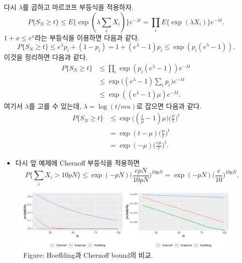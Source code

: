 \documentclass[
  letterpaper,
  DIV=11,
  numbers=noendperiod]{scrreprt}
\providecommand{\tightlist}{%
  \setlength{\itemsep}{0pt}\setlength{\parskip}{0pt}}
\theoremstyle{definition}
\theoremstyle{plain}
\theoremstyle{plain}
\theoremstyle{definition}
\theoremstyle{plain}
\theoremstyle{definition}
\theoremstyle{remark}
\begin{document}
\begin{tcolorbox}[enhanced jigsaw, left=2mm, arc=.35mm, leftrule=.75mm, colback=white, title=\textcolor{quarto-callout-note-color}{\faInfo}\hspace{0.5em}{Proof}, rightrule=.15mm, breakable, bottomrule=.15mm, coltitle=black, opacitybacktitle=0.6, opacityback=0, toptitle=1mm, titlerule=0mm, toprule=.15mm, colbacktitle=quarto-callout-note-color!10!white, bottomtitle=1mm, colframe=quarto-callout-note-color-frame]

다시 \(\lambda\)를 곱하고 마르코프 부등식을 적용하자. \[
P\{ S_N \geq t \} \leq E\{ \exp (\lambda \sum_{i} X_i) \}e^{-\lambda t} = \prod_i E\{ \exp (\lambda X_i) \}e^{-\lambda t}.
\] \(1+x \leq e^{x}\)라는 부등식을 이용하면 다음과 같다. \[
P\{ S_N \geq t \} \leq  e^{\lambda}p_i + (1-p_i) = 1 + (e^{\lambda} - 1)p_i \leq \exp (p_i (e^\lambda - 1)).
\] 이것을 정리하면 다음과 같다. \[
\begin{align*}
P\{ S_N \geq t \} &\leq \prod_i \exp (p_i (e^\lambda -1))e^{-\lambda t}\\
&\leq \exp \Big( (e^\lambda - 1)\sum_i p_i \Big) e^{-\lambda t}\\
&\leq \exp ((e^{\lambda}-1)\mu) e^{-\lambda t}.
\end{align*}
\] 여기서 \(\lambda\)를 고를 수 있는데, \(\lambda = \log (t/mu)\)로
잡으면 다음과 같다. \[
\begin{align*}
P\{ S_N \geq t \} &\leq \exp \Big( (\frac{t}{\mu}-1)\mu \Big) \Big( \frac{\mu}{t} \Big)^t\\
&= \exp (t-\mu) \Big( \frac{\mu}{t} \Big)^t\\
&=\exp (-\mu) \Big( \frac{e\mu}{t} \Big)^t.
\end{align*}
\]

\end{tcolorbox}

\begin{itemize}
\tightlist
\item
  다시 앞 예제에 Chernoff 부등식을 적용하면 \[
  P \{\sum_i X_i > 10pN \} \leq \exp (-p N) \Big( \frac{epN}{10pN}\Big)^{10pN} = \exp (-p N) \Big( \frac{e}{10}\Big)^{10pN}.
  \]
\end{itemize}

\begin{figure}[H]

{\centering \includegraphics[width=0.7\linewidth,height=\textheight,keepaspectratio]{ineq_files/figure-pdf/unnamed-chunk-5-1.pdf}

}

\caption{Figure: Hoeffding과 Chernoff bound의 비교.}

\end{figure}%
\end{document}
